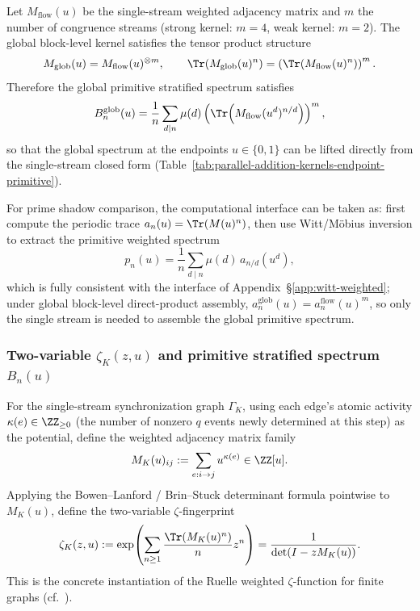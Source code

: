 \begin{corollary}\label{cor:par-add-global-lift-endpoints}
Let $M_{\mathrm{flow}}(u)$ be the single-stream weighted adjacency matrix and $m$ the number of congruence streams (strong kernel: $m=4$, weak kernel: $m=2$). The global block-level kernel satisfies the tensor product structure
\[
M_{\mathrm{glob}}(u)=M_{\mathrm{flow}}(u)^{\otimes m},
\qquad
\Tr(M_{\mathrm{glob}}(u)^n)=\left(\Tr(M_{\mathrm{flow}}(u)^n)\right)^m.
\]
Therefore the global primitive stratified spectrum satisfies
\[
B^{\mathrm{glob}}_{n}(u)=\frac{1}{n}\sum_{d\mid n}\mu(d)\left(\Tr\!\left(M_{\mathrm{flow}}(u^d)^{n/d}\right)\right)^m,
\]
so that the global spectrum at the endpoints $u\in\{0,1\}$ can be lifted directly from the single-stream closed form (Table~\ref{tab:parallel-addition-kernels-endpoint-primitive}).
\end{corollary}

For prime shadow comparison, the computational interface can be taken as: first compute the periodic trace $a_n(u)=\Tr(M(u)^n)$, then use Witt/M\"obius inversion to extract the primitive weighted spectrum
\[
p_n(u)=\frac{1}{n}\sum_{d\mid n}\mu(d)\,a_{n/d}(u^d),
\]
which is fully consistent with the interface of Appendix~\S\ref{app:witt-weighted}; under global block-level direct-product assembly, $a_n^{\mathrm{glob}}(u)=a_n^{\mathrm{flow}}(u)^m$, so only the single stream is needed to assemble the global primitive spectrum.

\subsubsection{Two-variable \texorpdfstring{$\zeta_K(z,u)$}{zeta(z,u)} and primitive stratified spectrum \texorpdfstring{$B_n(u)$}{B\_n(u)}}
For the single-stream synchronization graph $\Gamma_K$, using each edge's atomic activity $\kappa(e)\in\ZZ_{\ge 0}$ (the number of nonzero $q$ events newly determined at this step) as the potential, define the weighted adjacency matrix family
\[
M_K(u)_{ij}:=\sum_{e:i\to j}u^{\kappa(e)}\in\ZZ[u].
\]
Applying the Bowen--Lanford / Brin--Stuck determinant formula pointwise to $M_K(u)$, define the two-variable $\zeta$-fingerprint
\[
\zeta_K(z,u)
:=\exp\!\left(\sum_{n\ge 1}\frac{\Tr(M_K(u)^n)}{n}z^n\right)
=\frac{1}{\det(I-zM_K(u))}.
\]
This is the concrete instantiation of the Ruelle weighted $\zeta$-function for finite graphs (cf.\ \cite{Ruelle1976ZetaExpanding,ParryPollicott1990Zeta,BrinStuck2002}).

